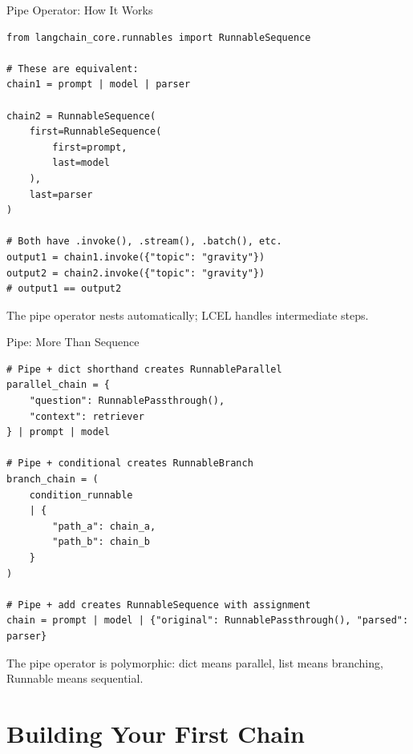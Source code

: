 \documentclass[aspectratio=169,11pt]{beamer}
\begin{document}
\begin{frame}[fragile]{Pipe Operator: How It Works}
  \begin{codebox}
\begin{lstlisting}
from langchain_core.runnables import RunnableSequence

# These are equivalent:
chain1 = prompt | model | parser

chain2 = RunnableSequence(
    first=RunnableSequence(
        first=prompt,
        last=model
    ),
    last=parser
)

# Both have .invoke(), .stream(), .batch(), etc.
output1 = chain1.invoke({"topic": "gravity"})
output2 = chain2.invoke({"topic": "gravity"})
# output1 == output2
\end{lstlisting}
  \end{codebox}

  \vspace{0.12em}
  \small The pipe operator nests automatically; LCEL handles intermediate steps.
\end{frame}

\begin{frame}[fragile]{Pipe: More Than Sequence}
  \begin{codebox}
\begin{lstlisting}
# Pipe + dict shorthand creates RunnableParallel
parallel_chain = {
    "question": RunnablePassthrough(),
    "context": retriever
} | prompt | model

# Pipe + conditional creates RunnableBranch
branch_chain = (
    condition_runnable
    | {
        "path_a": chain_a,
        "path_b": chain_b
    }
)

# Pipe + add creates RunnableSequence with assignment
chain = prompt | model | {"original": RunnablePassthrough(), "parsed": parser}
\end{lstlisting}
  \end{codebox}

  \vspace{0.12em}
  \small The pipe operator is polymorphic: dict means parallel, list means branching, Runnable means sequential.
\end{frame}

\section{Building Your First Chain}
\end{document}
